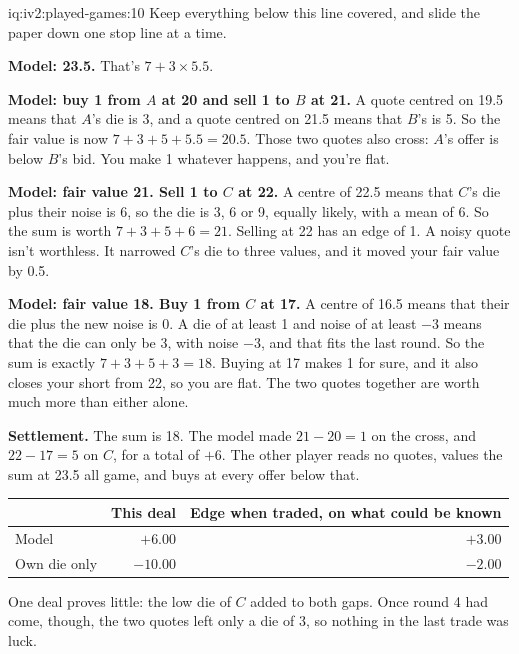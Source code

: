 \begin{solution}{iq:iv2:played-games:10}
Keep everything below this line covered, and slide the paper down one stop line at a time.

\ivstop
\textbf{Model: 23.5.} That's $7 + 3 \times 5.5$.

\ivstop
\textbf{Model: buy 1 from $A$ at 20 and sell 1 to $B$ at 21.} A quote centred on 19.5 means that $A$'s die is 3, and a quote centred on 21.5 means that $B$'s is 5. So the fair value is now $7 + 3 + 5 + 5.5 = 20.5$. Those two quotes also cross: $A$'s offer is below $B$'s bid. You make 1 whatever happens, and you're flat.

\ivstop
\textbf{Model: fair value 21. Sell 1 to $C$ at 22.} A centre of 22.5 means that $C$'s die plus their noise is 6, so the die is 3, 6 or 9, equally likely, with a mean of 6. So the sum is worth $7 + 3 + 5 + 6 = 21$. Selling at 22 has an edge of 1. A noisy quote isn't worthless. It narrowed $C$'s die to three values, and it moved your fair value by 0.5.

\ivstop
\textbf{Model: fair value 18. Buy 1 from $C$ at 17.} A centre of 16.5 means that their die plus the new noise is 0. A die of at least 1 and noise of at least $-3$ means that the die can only be 3, with noise $-3$, and that fits the last round. So the sum is exactly $7 + 3 + 5 + 3 = 18$. Buying at 17 makes 1 for sure, and it also closes your short from 22, so you are flat. The two quotes together are worth much more than either alone.

\medskip
\textbf{Settlement.} The sum is 18. The model made $21 - 20 = 1$ on the cross, and $22 - 17 = 5$ on $C$, for a total of $+6$. The other player reads no quotes, values the sum at 23.5 all game, and buys at every offer below that.
\begin{center}\small
\begin{tabular}{@{}lrr@{}}
 & This deal & Edge when traded, on what could be known \\ \hline
Model & $+6.00$ & $+3.00$ \\
Own die only & $-10.00$ & $-2.00$
\end{tabular}
\end{center}
One deal proves little: the low die of $C$ added to both gaps. Once round 4 had come, though, the two quotes left only a die of 3, so nothing in the last trade was luck.


\end{solution}
